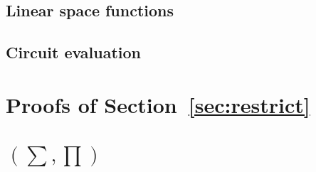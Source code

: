 \subsection{Linear space functions}


\subsection{Circuit evaluation}


\section{Proofs of Section~\ref{sec:restrict}}


\section{\lang$(\sum,\prod)$}


